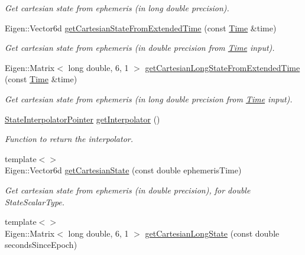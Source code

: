 \begin{DoxyCompactItemize}
\begin{DoxyCompactList}\small\item\em Get cartesian state from ephemeris (in long double precision). \end{DoxyCompactList}\item 
Eigen\+::\+Vector6d \hyperlink{classtudat_1_1ephemerides_1_1TabulatedCartesianEphemeris_ae85412c7f3d9925b17656d5adf45949e}{get\+Cartesian\+State\+From\+Extended\+Time} (const \hyperlink{classtudat_1_1Time}{Time} \&time)
\begin{DoxyCompactList}\small\item\em Get cartesian state from ephemeris (in double precision from \hyperlink{classtudat_1_1Time}{Time} input). \end{DoxyCompactList}\item 
Eigen\+::\+Matrix$<$ long double, 6, 1 $>$ \hyperlink{classtudat_1_1ephemerides_1_1TabulatedCartesianEphemeris_a6243b4b5b33eaca2407df79d0032788b}{get\+Cartesian\+Long\+State\+From\+Extended\+Time} (const \hyperlink{classtudat_1_1Time}{Time} \&time)
\begin{DoxyCompactList}\small\item\em Get cartesian state from ephemeris (in long double precision from \hyperlink{classtudat_1_1Time}{Time} input). \end{DoxyCompactList}\item 
\hyperlink{classtudat_1_1ephemerides_1_1TabulatedCartesianEphemeris_ac99b60b8a32901ffa73148e7d6eb557a}{State\+Interpolator\+Pointer} \hyperlink{classtudat_1_1ephemerides_1_1TabulatedCartesianEphemeris_a287b1df5480cc7fb1cbbdd02f08aab5f}{get\+Interpolator} ()
\begin{DoxyCompactList}\small\item\em Function to return the interpolator. \end{DoxyCompactList}\item 
{\footnotesize template$<$$>$ }\\Eigen\+::\+Vector6d \hyperlink{classtudat_1_1ephemerides_1_1TabulatedCartesianEphemeris_a73d4e6226a2fe278f84dc9889fad0d81}{get\+Cartesian\+State} (const double ephemeris\+Time)\hypertarget{classtudat_1_1ephemerides_1_1TabulatedCartesianEphemeris_a73d4e6226a2fe278f84dc9889fad0d81}{}\label{classtudat_1_1ephemerides_1_1TabulatedCartesianEphemeris_a73d4e6226a2fe278f84dc9889fad0d81}

\begin{DoxyCompactList}\small\item\em Get cartesian state from ephemeris (in double precision), for double State\+Scalar\+Type. \end{DoxyCompactList}\item 
{\footnotesize template$<$$>$ }\\Eigen\+::\+Matrix$<$ long double, 6, 1 $>$ \hyperlink{classtudat_1_1ephemerides_1_1TabulatedCartesianEphemeris_abe3c0d7f7ad0c4c7e04006f3142f2a02}{get\+Cartesian\+Long\+State} (const double seconds\+Since\+Epoch)\hypertarget{classtudat_1_1ephemerides_1_1TabulatedCartesianEphemeris_abe3c0d7f7ad0c4c7e04006f3142f2a02}{}\label{classtudat_1_1ephemerides_1_1TabulatedCartesianEphemeris_abe3c0d7f7ad0c4c7e04006f3142f2a02}


\end{DoxyCompactItemize}
